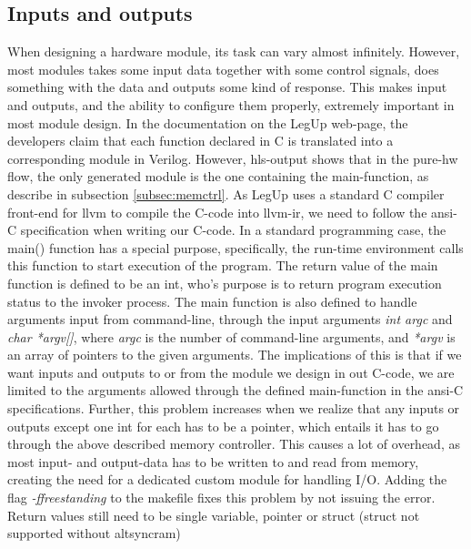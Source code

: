 \subsection{\label{subsec:inoutprobs}Inputs and outputs}
When designing a hardware module, its task can vary almost infinitely. However, most modules takes some input data together with some control signals, does something with the data and outputs some kind of response. This makes input and outputs, and the ability to configure them properly, extremely important in most module design. In the documentation on the LegUp web-page, the developers claim that each function declared in C is translated into a corresponding module in Verilog. However, \gls{hls}-output shows that in the pure-\gls{hw} flow, the only generated module is the one containing the main-function, as describe in subsection \ref{subsec:memctrl}. As LegUp uses a standard C compiler front-end for \gls{llvm} to compile the C-code into \gls{llvm}-\gls{ir}, we need to follow the \gls{ansi}-C specification when writing our C-code. In a standard programming case, the main() function has a special purpose, specifically, the run-time environment calls this function to start execution of the program. The return value of the main function is defined to be an int, who's purpose is to return program execution status to the invoker process. The main function is also defined to handle arguments input from command-line, through the input arguments \textit{int argc} and \textit{char *argv[]}, where \textit{argc} is the number of command-line arguments, and \textit{*argv} is an array of pointers to the given arguments. The implications of this is that if we want inputs and outputs to or from the module we design in out C-code, we are limited to the arguments allowed through the defined main-function in the \gls{ansi}-C specifications. Further, this problem increases when we realize that any inputs or outputs except one int for each has to be a pointer, which entails it has to go through the above described memory controller. This causes a lot of overhead, as most input- and output-data has to be written to and read from memory, creating the need for a dedicated custom module for handling I/O. Adding the flag \textit{-ffreestanding} to the makefile fixes this problem by not issuing the error. Return values still need to be single variable, pointer or struct (struct not supported without altsyncram)
